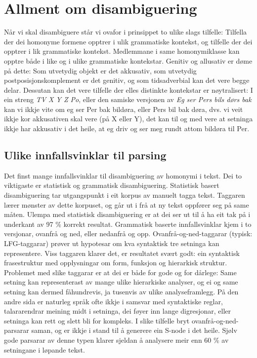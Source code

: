 \documentclass[a4paper,nynorsk]{article}
\begin{document}
\section{Allment om disambiguering}

Når vi skal disambiguere står vi ovafor i prinsippet to ulike slags tilfelle: Tilfella der dei homonyme formene opptrer i ulik grammatiske kontekst, og tilfelle der dei opptrer i lik grammatiske kontekst. Medlemmane i same homonymiklasse kan opptre både i like og i ulike grammatiske kontekstar. Genitiv og allusativ er døme på dette: Som utvetydig objekt er det akkusativ, som utvetydig postposisjonskomplement er det genitiv, og som tidsadverbial kan det vere begge delar. Dessutan kan det vere tilfelle der elles distinkte kontekstar er nøytralisert: I ein streng \textit{TV X Y Z Po}, eller den samiske versjonen av \textit{Eg ser Pers bils dørs bak} kan vi ikkje vite om eg ser Per bak bildøra, eller Pers bil bak døra, dvs. vi veit ikkje kor akkusativen skal vere (på X eller Y), det kan til og med vere at setninga ikkje har akkusativ i det heile, at eg driv og ser meg rundt attom bildøra til Per.%


\subsection{Ulike innfallsvinklar til parsing}

Det finst mange innfallsvinklar til disambiguering av homonymi i tekst. Dei to viktigaste er statistisk og grammatisk disambiguering. Statistisk basert disambiguering tar utgangspunkt i eit korpus av manuelt tagga tekst. Taggaren lærer mønster av dette korpuset, og går ut i frå at ny tekst oppfører seg på same måten. Ulempa med statistisk disambiguering er at dei ser ut til å ha eit tak på i underkant av 97 \% korrekt resultat.  Grammatisk baserte innfallsvinklar kjem i to versjonar, ovanfrå og ned, eller nedanfrå og opp. Ovanfrå-og-ned-taggarar (typisk: LFG-taggarar) prøver ut hypotesar om kva syntaktisk tre setninga kan representere. Viss taggaren klarer det, er resultatet svært godt: ein syntaktisk frasestruktur med opplysningar om form, funksjon og hierarkisk struktur. Problemet med slike taggarar er at dei er både for gode og for dårlege: Same setning kan representerast av mange ulike hierarkiske analyser, og ei og same setning kan dermed fåhundrevis, ja tusenvis av ulike analyseframlegg. På den andre sida er naturleg språk ofte ikkje i samsvar med syntaktiske reglar, talararendrar meining midt i setninga, dei føyer inn lange digresjonar, eller setninga kan rett og slett bli for kompleks. I slike tilfelle bryt ovanfrå-og-ned-parsarar saman, og er ikkje i stand til å generere ein S-node i det heile. Sjølv gode parsarar av denne typen klarer sjeldan å analysere meir enn 60 \% av setningane i løpande tekst.%
\end{document}
